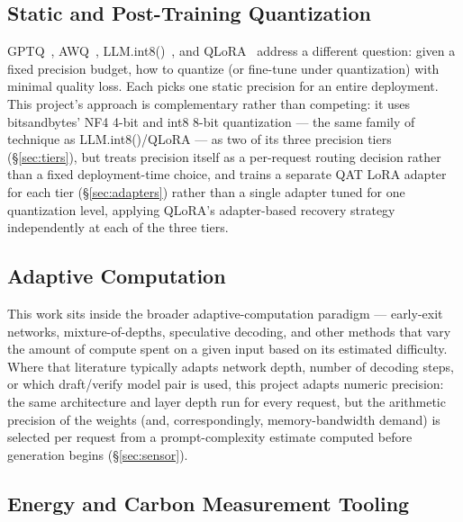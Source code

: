 \documentclass[conference]{IEEEtran}
\begin{document}
\subsection{Static and Post-Training Quantization}

GPTQ~\cite{gptq}, AWQ~\cite{awq}, LLM.int8()~\cite{llmint8}, and
QLoRA~\cite{qlora} address a different question: given a fixed precision
budget, how to quantize (or fine-tune under quantization) with minimal
quality loss. Each picks one static precision for an entire deployment.
This project's approach is complementary rather than competing: it uses
bitsandbytes' NF4 4-bit and int8 8-bit quantization --- the same family
of technique as LLM.int8()/QLoRA --- as two of its three precision tiers
(\S\ref{sec:tiers}), but treats precision itself as a per-request routing
decision rather than a fixed deployment-time choice, and trains a
separate QAT LoRA adapter for each tier (\S\ref{sec:adapters}) rather
than a single adapter tuned for one quantization level, applying QLoRA's
adapter-based recovery strategy independently at each of the three tiers.

\subsection{Adaptive Computation}

This work sits inside the broader adaptive-computation paradigm ---
early-exit networks, mixture-of-depths, speculative decoding, and other
methods that vary the amount of compute spent on a given input based on
its estimated difficulty. Where that literature typically adapts network
depth, number of decoding steps, or which draft/verify model pair is
used, this project adapts numeric precision: the same architecture and
layer depth run for every request, but the arithmetic precision of the
weights (and, correspondingly, memory-bandwidth demand) is selected per
request from a prompt-complexity estimate computed before generation
begins (\S\ref{sec:sensor}).

\subsection{Energy and Carbon Measurement Tooling}
\end{document}
